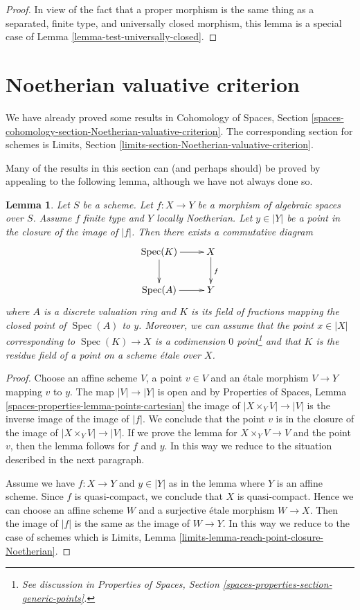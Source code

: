 \documentclass{stacks-project}
\theoremstyle{plain}
\newtheorem{lemma}[subsection]{Lemma}
\theoremstyle{definition}
\theoremstyle{remark}
\numberwithin{equation}{subsection}
\def\Spec{\mathop{\mathrm{Spec}}}
\begin{document}
\begin{proof}
In view of the fact that a proper morphism is the same thing as
a separated, finite type, and universally closed morphism, this
lemma is a special case of Lemma \ref{lemma-test-universally-closed}.
\end{proof}


\section{Noetherian valuative criterion}
\label{section-Noetherian-valuative-criterion}

\noindent
We have already proved some results in Cohomology of Spaces, Section
\ref{spaces-cohomology-section-Noetherian-valuative-criterion}.
The corresponding section for schemes is
Limits, Section \ref{limits-section-Noetherian-valuative-criterion}.

\medskip\noindent
Many of the results in this section can (and perhaps should)
be proved by appealing to the following lemma, although we have not
always done so.

\begin{lemma}
\label{lemma-reach-point-closure-Noetherian}
Let $S$ be a scheme. Let $f : X \to Y$ be a morphism of algebraic spaces
over $S$. Assume $f$ finite type and $Y$ locally Noetherian.
Let $y \in |Y|$ be a point in the closure of the image of $|f|$.
Then there exists a commutative diagram
$$
\xymatrix{
\Spec(K) \ar[r] \ar[d] & X \ar[d]^f \\
\Spec(A) \ar[r] & Y
}
$$
where $A$ is a discrete valuation ring and $K$ is its field of fractions
mapping the closed point of $\Spec(A)$ to $y$. Moreover, we can assume
that the point $x \in |X|$ corresponding to $\Spec(K) \to X$ is a
codimension $0$ point\footnote{See discussion in
Properties of Spaces, Section \ref{spaces-properties-section-generic-points}.}
and that $K$ is the residue field of a point
on a scheme \'etale over $X$.
\end{lemma}

\begin{proof}
Choose an affine scheme $V$, a point $v \in V$ and an \'etale morphism
$V \to Y$ mapping $v$ to $y$. The map $|V| \to |Y|$ is open and by
Properties of Spaces, Lemma \ref{spaces-properties-lemma-points-cartesian}
the image of $|X \times_Y V| \to |V|$ is the inverse image of the
image of $|f|$. We conclude that the point $v$ is in the closure of the
image of $|X \times_Y V| \to |V|$. If we prove the lemma for
$X \times_Y V \to V$ and the point $v$, then the lemma follows for
$f$ and $y$. In this way we reduce to the situation described in the
next paragraph.

\medskip\noindent
Assume we have $f : X \to Y$ and $y \in |Y|$ as in the lemma where
$Y$ is an affine scheme. Since $f$ is quasi-compact, we conclude that
$X$ is quasi-compact. Hence we can choose an affine scheme $W$ and
a surjective \'etale morphism $W \to X$. Then the image of
$|f|$ is the same as the image of $W \to Y$. In this way we reduce
to the case of schemes which is
Limits, Lemma \ref{limits-lemma-reach-point-closure-Noetherian}.
\end{proof}
\end{document}
